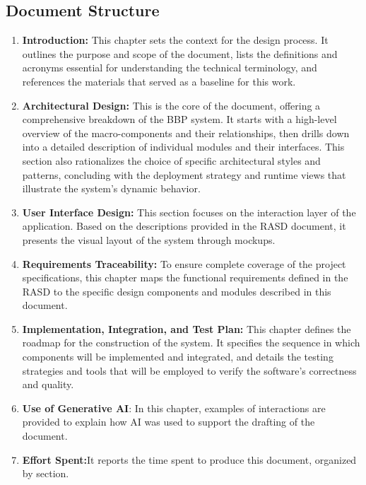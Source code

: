 \subsection{Document Structure}
\begin{enumerate}
    \item \textbf{Introduction:} This chapter sets the context for the design process. It outlines the purpose and scope of the document, lists the definitions and acronyms essential for understanding the technical terminology, and references the materials that served as a baseline for this work.
    \item \textbf{Architectural Design:} This is the core of the document, offering a comprehensive breakdown of the BBP system. It starts with a high-level overview of the macro-components and their relationships, then drills down into a detailed description of individual modules and their interfaces. This section also rationalizes the choice of specific architectural styles and patterns, concluding with the deployment strategy and runtime views that illustrate the system's dynamic behavior.
    \item \textbf{User Interface Design:} This section focuses on the interaction layer of the application. Based on the descriptions provided in the RASD document, it presents the visual layout of the system through mockups.
    \item \textbf{Requirements Traceability:} To ensure complete coverage of the project specifications, this chapter maps the functional requirements defined in the RASD to the specific design components and modules described in this document.
    \item \textbf{Implementation, Integration, and Test Plan:} This chapter defines the roadmap for the construction of the system. It specifies the sequence in which components will be implemented and integrated, and details the testing strategies and tools that will be employed to verify the software's correctness and quality.
    \item \textbf{Use of Generative AI}: In this chapter, examples of interactions are provided to explain how AI was used to support the drafting of the document.
    \item \textbf{Effort Spent:}It reports the time spent to produce this document, organized by section.
\end{enumerate}